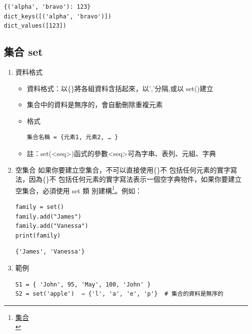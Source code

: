 \documentclass[a4paper,12pt]{article}
\begin{document}
\begin{enumerate}
\begin{verbatim}
{('alpha', 'bravo'): 123}
dict_keys([('alpha', 'bravo')])
dict_values([123])
\end{verbatim}
\end{enumerate}

\subsection{集合 set}
\label{sec:orgd18d2ab}
\begin{enumerate}
\item 資料格式
\label{sec:org3a5262e}
\begin{itemize}
\item 資料格式：以\{\}將各組資料含括起來，以','分隔,或以 set()建立\\
\item 集合中的資料是無序的，會自動刪除重複元素\\
\item 格式\\
\lstset{breaklines=true,language=Python,label= ,caption= ,captionpos=b,firstnumber=1,numbers=left}
\begin{lstlisting}
集合名稱 = {元素1, 元素2, … }
\end{lstlisting}
\item 註：set(<seq>)函式的參數<seq>可為字串、表列、元組、字典\\
\end{itemize}

\item 空集合
\label{sec:org0623a44}
如果你要建立空集合，不可以直接使用\{\}不 包括任何元素的實字寫法，因為\{\}不 包括任何元素的實字寫法表示一個空字典物件，如果你要建立空集合，必須使用 set 類 別建構\footnote{\href{https://openhome.cc/Gossip/Python/SetType.html}{集合}\\}。例如：\\
\lstset{breaklines=true,language=Python,label= ,caption= ,captionpos=b,firstnumber=1,numbers=left}
\begin{lstlisting}
family = set()
family.add("James")
family.add("Vanessa")
print(family)
\end{lstlisting}

\begin{verbatim}
{'James', 'Vanessa'}
\end{verbatim}

\item 範例
\label{sec:org3753fa9}
\lstset{breaklines=true,language=Python,label= ,caption= ,captionpos=b,firstnumber=1,numbers=left}
\begin{lstlisting}
S1 = { 'John', 95, 'May', 100, 'John' } 
S2 = set('apple')  ⇒ {'l', 'a', 'e', 'p'}  # 集合的資料是無序的
\end{lstlisting}


\end{enumerate}
\end{document}
